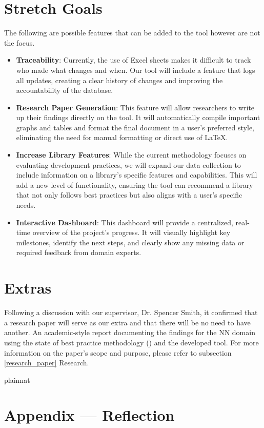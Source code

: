 \documentclass{article}
\begin{document}
\section{Stretch Goals}
The following are possible features that can be added to the tool however are not the focus.
\begin{itemize}
    \item \textbf{Traceability}: Currently, the use of Excel sheets makes it difficult to track who made what changes and when. Our tool will include a feature that logs all updates, creating a clear history of changes and improving the accountability of the database.
    \item \textbf{Research Paper Generation}: This feature will allow researchers to write up their findings directly on the tool. It will automatically compile important graphs and tables and format the final document in a user's preferred style, eliminating the need for manual formatting or direct use of LaTeX.
    \item \textbf{Increase Library Features}: While the current methodology focuses on evaluating development practices, we will expand our data collection to include information on a library's specific features and capabilities. This will add a new level of functionality, ensuring the tool can recommend a library that not only follows best practices but also aligns with a user's specific needs.
    \item \textbf{Interactive Dashboard}: This dashboard will provide a centralized, real-time overview of the project's progress. It will visually highlight key milestones, identify the next steps, and clearly show any missing data or required feedback from domain experts.
\end{itemize}
\section{Extras}
Following a discussion with our supervisor, Dr. Spencer Smith, it confirmed that a research paper will serve as our extra and that there will be no need to have another.
An academic-style report documenting the findings for the NN domain using the state of best practice methodology (\cite{MethodologyPaper}) and the developed tool.
For more information on the paper's scope and purpose, please refer to subsection \ref{research_paper} Research.

\newpage{}
 {plainnat}

\section*{Appendix --- Reflection}
\end{document}
